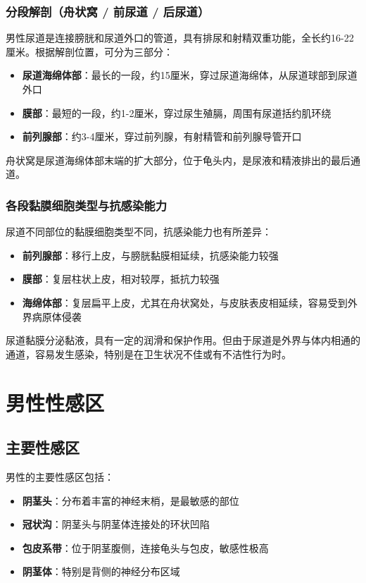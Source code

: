 \subsubsection{分段解剖（舟状窝 / 前尿道 / 后尿道）}

男性尿道是连接膀胱和尿道外口的管道，具有排尿和射精双重功能，全长约16-22厘米。根据解剖位置，可分为三部分：

\begin{itemize}
    \item \textbf{尿道海绵体部}：最长的一段，约15厘米，穿过尿道海绵体，从尿道球部到尿道外口
    \item \textbf{膜部}：最短的一段，约1-2厘米，穿过尿生殖膈，周围有尿道括约肌环绕
    \item \textbf{前列腺部}：约3-4厘米，穿过前列腺，有射精管和前列腺导管开口
\end{itemize}

舟状窝是尿道海绵体部末端的扩大部分，位于龟头内，是尿液和精液排出的最后通道。

\subsubsection{各段黏膜细胞类型与抗感染能力}

尿道不同部位的黏膜细胞类型不同，抗感染能力也有所差异：

\begin{itemize}
    \item \textbf{前列腺部}：移行上皮，与膀胱黏膜相延续，抗感染能力较强
    \item \textbf{膜部}：复层柱状上皮，相对较厚，抵抗力较强
    \item \textbf{海绵体部}：复层扁平上皮，尤其在舟状窝处，与皮肤表皮相延续，容易受到外界病原体侵袭
\end{itemize}

尿道黏膜分泌黏液，具有一定的润滑和保护作用。但由于尿道是外界与体内相通的通道，容易发生感染，特别是在卫生状况不佳或有不洁性行为时。

\section{男性性感区}
\subsection{主要性感区}

男性的主要性感区包括：

\begin{itemize}
    \item \textbf{阴茎头}：分布着丰富的神经末梢，是最敏感的部位
    \item \textbf{冠状沟}：阴茎头与阴茎体连接处的环状凹陷
    \item \textbf{包皮系带}：位于阴茎腹侧，连接龟头与包皮，敏感性极高
    \item \textbf{阴茎体}：特别是背侧的神经分布区域
\end{itemize}

